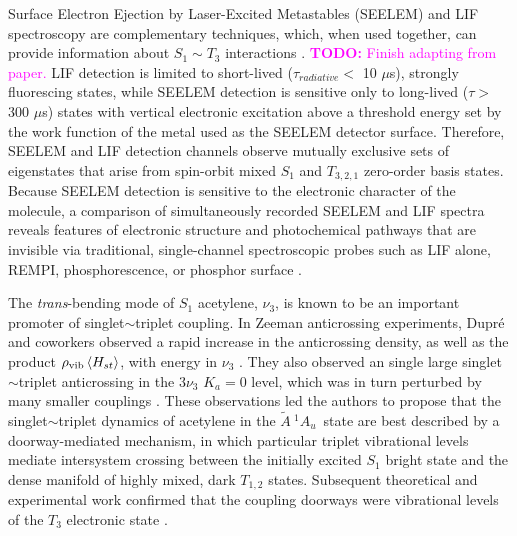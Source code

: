 \documentclass[12pt,draft]{mitthesis}
\newcommand{\TODO} [1]{\textcolor{magenta}{\textbf{TODO:} #1}}
\newcommand{\rcm}{cm$^{-1}$}
\newcommand{\astate}{$
  \tilde{A} \: ^1\!A_u
  $}
\newcommand{\StoS}{$
  S_1 \leftarrow S_0
  $}
\newcommand{\microsec}{$\mu$s}
\begin{document}
Surface Electron Ejection by Laser-Excited Metastables \cite{sneh89a,
  sneh89b, sneh91, humphrey97} (SEELEM) and LIF spectroscopy are
complementary techniques, which, when used together, can provide
information about $S_1 \sim T_3$ interactions \cite{humphrey97,
  mishra04, altunata00, altunata02}.  \TODO{Finish adapting from
  paper.}  LIF detection is limited to short-lived
($\tau_{radiative}<$ 10 \microsec), strongly fluorescing states, while
SEELEM detection is sensitive only to long-lived ($\tau >$ 300
\microsec) states with vertical electronic excitation above a
threshold energy set by the work function of the metal used as the
SEELEM detector surface. Therefore, SEELEM and LIF detection channels
observe mutually exclusive sets of eigenstates that arise from
spin-orbit mixed $S_1$ and $T_{3,2,1}$ zero-order basis states.
Because SEELEM detection is sensitive to the electronic character of
the molecule, a comparison of simultaneously recorded SEELEM and LIF
spectra reveals features of electronic structure and photochemical
pathways that are invisible via traditional, single-channel
spectroscopic probes such as LIF alone, REMPI, phosphorescence, or
phosphor surface \cite{shi98, campos01, burton72}.


The \emph{trans}-bending mode of $S_1$ acetylene, $\nu_3$, is known to
be an important promoter of singlet$\sim$triplet coupling.  In Zeeman
anticrossing experiments, Dupr\'{e} and coworkers observed a rapid
increase in the anticrossing density, as well as the product
$\rho_{\text{vib}} \mathinner{\langle{H_{st}}\rangle}$, with energy in $\nu_3$
\cite{dupre91, dupre95b}.  They also observed an single large
singlet$\sim$triplet anticrossing in the $3 \nu_3$ $K_a=0$ level,
which was in turn perturbed by many smaller couplings \cite{dupre93}.
These observations led the authors to propose that the
singlet$\sim$triplet dynamics of acetylene in the \astate\ state are
best described by a doorway-mediated mechanism, in which particular
triplet vibrational levels mediate intersystem crossing between the
initially excited $S_1$ bright state and the dense manifold of highly
mixed, dark $T_{1,2}$ states.  Subsequent theoretical and experimental
work confirmed that the coupling doorways were vibrational levels of
the $T_3$ electronic state \cite{vacek96, sherrill96, humphrey97,
  altunata00}.
\end{document}
